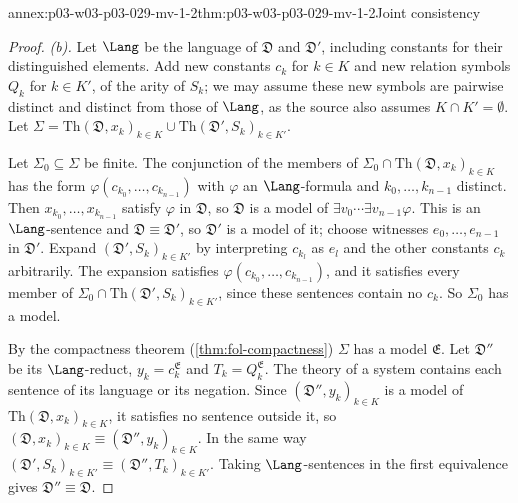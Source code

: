 \begin{annexitem}{annex:p03-w03-p03-029-mv-1-2}{thm:p03-w03-p03-029-mv-1-2}{Joint consistency}
\begin{proof}
\emph{(b).} Let \(\Lang\) be the language of \(\mathfrak D\) and
\(\mathfrak D'\), including constants for their distinguished elements. Add
new constants \(c_k\) for \(k\in K\) and new relation symbols \(Q_k\) for
\(k\in K'\), of the arity of \(S_k\); we may assume these new symbols are
pairwise distinct and distinct from those of \(\Lang\), as the source also
assumes \(K\cap K'=\emptyset\). Let
\(\Sigma=\mathrm{Th}(\mathfrak D,x_k)_{k\in K}\cup\mathrm{Th}(\mathfrak
D',S_k)_{k\in K'}\).

Let \(\Sigma_0\subseteq\Sigma\) be finite. The conjunction of the members of
\(\Sigma_0\cap\mathrm{Th}(\mathfrak D,x_k)_{k\in K}\) has the form
\(\varphi(c_{k_0},\ldots,c_{k_{n-1}})\) with \(\varphi\) an
\(\Lang\)-formula and \(k_0,\ldots,k_{n-1}\) distinct. Then
\(x_{k_0},\ldots,x_{k_{n-1}}\) satisfy \(\varphi\) in \(\mathfrak D\), so
\(\mathfrak D\) is a model of \(\exists v_0\cdots\exists
v_{n-1}\varphi\). This is an \(\Lang\)-sentence and \(\mathfrak
D\equiv\mathfrak D'\), so \(\mathfrak D'\) is a model of it; choose
witnesses \(e_0,\ldots,e_{n-1}\) in \(\mathfrak D'\). Expand
\((\mathfrak D',S_k)_{k\in K'}\) by interpreting \(c_{k_l}\) as \(e_l\) and the
other constants \(c_k\) arbitrarily. The expansion satisfies
\(\varphi(c_{k_0},\ldots,c_{k_{n-1}})\), and it satisfies every member of
\(\Sigma_0\cap\mathrm{Th}(\mathfrak D',S_k)_{k\in K'}\), since these
sentences contain no \(c_k\). So \(\Sigma_0\) has a model.

By the compactness theorem (\cref{thm:fol-compactness}) \(\Sigma\) has a
model \(\mathfrak E\). Let \(\mathfrak D''\) be its \(\Lang\)-reduct,
\(y_k=c_k^{\mathfrak E}\) and \(T_k=Q_k^{\mathfrak E}\). The theory of a
system contains each sentence of its language or its negation. Since
\((\mathfrak D'',y_k)_{k\in K}\) is a model of
\(\mathrm{Th}(\mathfrak D,x_k)_{k\in K}\), it satisfies no sentence outside
it, so \((\mathfrak D,x_k)_{k\in K}\equiv(\mathfrak D'',y_k)_{k\in K}\). In
the same way \((\mathfrak D',S_k)_{k\in K'}\equiv(\mathfrak
D'',T_k)_{k\in K'}\). Taking \(\Lang\)-sentences in the first equivalence
gives \(\mathfrak D''\equiv\mathfrak D\).


\end{proof}
\end{annexitem}
